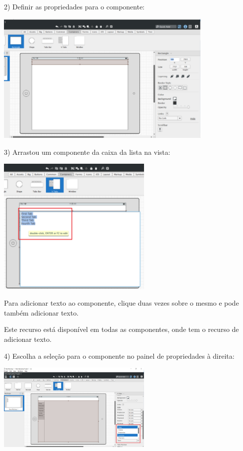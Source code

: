 \documentclass{tufte-book} %
\begin{document}
2) Definir as propriedades para o componente:

\begin{center}
	\includegraphics[width=10.50cm]{img12.png}
\end{center}

\break

3) Arrastou um componente da caixa da lista na vista:

\begin{center}
	\includegraphics[width=7.50cm]{img13.png}
\end{center}

Para adicionar texto ao componente, clique duas vezes sobre o mesmo e pode também adicionar texto.

Este recurso está disponível em todas as componentes, onde tem o recurso de adicionar texto.

4) Escolha a seleção para o componente no painel de propriedades à direita:

\begin{center}
	\includegraphics[width=7.50cm]{img14.png}
\end{center}
\end{document}
